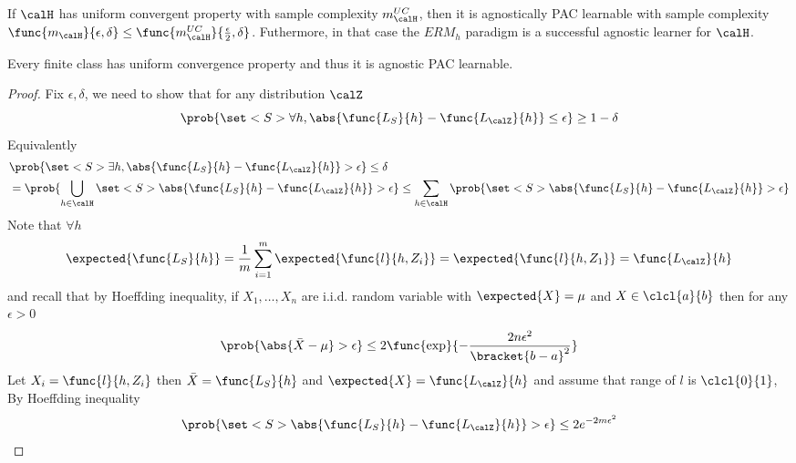 \begin{proposition}
    If \(\calH\) has uniform convergent property with sample complexity \(m^{UC}_{\calH}\), then it is agnostically PAC learnable with sample complexity \(\func{m_{\calH}}{\epsilon,\delta} \leq \func{m^{UC}_{\calH}}{\frac{\epsilon}{2}, \delta}\). Futhermore, in that case the \(ERM_h\) paradigm is a successful agnostic learner for \(\calH\).
\end{proposition}

\begin{theorem}
    Every finite class has uniform convergence property and thus it is agnostic PAC learnable. 
\end{theorem}
\begin{proof}
    Fix \(\epsilon, \delta\), we need to show that for any distribution \(\calZ\) 
    \begin{equation*}
        \prob{\set<S>{\forall h, \abs{\func{L_S}{h} - \func{L_{\calZ}}{h}} \leq \epsilon }} \geq 1- \delta
    \end{equation*}
    Equivalently 
    \begin{align*}
        &\prob{\set<S>{\exists h, \abs{\func{L_S}{h} - \func{L_{\calZ}}{h}} > \epsilon }} \leq \delta\\
        &= \prob{\bigcup_{h \in \calH} \set<S>{\abs{\func{L_S}{h} - \func{L_{\calZ}}{h}} > \epsilon }} \leq \sum_{h \in \calH} \prob{\set<S>{\abs{\func{L_S}{h} - \func{L_{\calZ}}{h}} > \epsilon }}
    \end{align*}
    Note that \(\forall h\)
    \begin{equation*}
        \expected{\func{L_S}{h}} = \dfrac{1}{m} \sum_{i = 1}^m \expected{\func{l}{h,Z_i}} = \expected{\func{l}{h,Z_1}} = \func{L_{\calZ}}{h}
    \end{equation*}
    and recall that by Hoeffding inequality, if \(X_1, \dots , X_n\) are i.i.d. random variable with \(\expected{X} = \mu\) and \(X \in \clcl{a}{b}\) then for any \(\epsilon > 0\)
    \begin{equation*}
        \prob{\abs{\bar{X} - \mu} > \epsilon} \leq 2 \func{\exp}{-\dfrac{2n\epsilon^2}{\bracket{b-a}^2}}
    \end{equation*}
    Let \(X_i = \func{l}{h,Z_i}\) then \(\bar{X} = \func{L_S}{h}\) and \(\expected{X} = \func{L_{\calZ}}{h}\) and assume that range of \(l\) is \(\clcl{0}{1}\), By Hoeffding inequality 
    \begin{equation*}
        \prob{\set<S>{\abs{\func{L_S}{h} - \func{L_{\calZ}}{h}} > \epsilon }} \leq 2 e^{-2m\epsilon^2}
    \end{equation*}

\end{proof}
